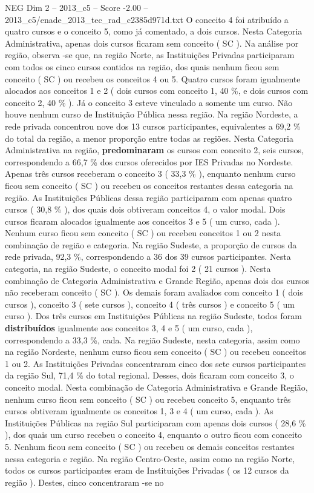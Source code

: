 \begin{textsample}{NEG Dim 2 – 2013\_c5 – Score -2.00 – 2013\_c5/enade\_2013\_tec\_rad\_c2385d971d.txt}
O conceito 4 foi atribuído a quatro cursos e o conceito 5, como já comentado, a dois cursos.
Nesta Categoria Administrativa, apenas dois cursos ficaram sem conceito ( SC ).
Na análise por região, observa -se que, na região Norte, as Instituições Privadas participaram com todos os cinco cursos contidos na região, dos quais nenhum ficou sem conceito ( SC ) ou recebeu os conceitos 4 ou 5.
Quatro cursos foram igualmente alocados aos conceitos 1 e 2 ( dois cursos com conceito 1, 40 \%, e dois cursos com conceito 2, 40 \% ).
Já o conceito 3 esteve vinculado a somente um curso.
Não houve nenhum curso de Instituição Pública nessa região.
Na região Nordeste, a rede privada concentrou nove dos 13 cursos participantes, equivalentes a 69,2 \% do total da região, a menor proporção entre todas as regiões.
Nesta Categoria Administrativa na região, \textbf{predominaram} os cursos com conceito 2, seis cursos, correspondendo a 66,7 \% dos cursos oferecidos por IES Privadas no Nordeste.
Apenas três cursos receberam o conceito 3 ( 33,3 \% ), enquanto nenhum curso ficou sem conceito ( SC ) ou recebeu os conceitos restantes dessa categoria na região.
As Instituições Públicas dessa região participaram com apenas quatro cursos ( 30,8 \% ), dos quais dois obtiveram conceitos 4, o valor modal.
Dois cursos ficaram alocados igualmente aos conceitos 3 e 5 ( um curso, cada ).
Nenhum curso ficou sem conceito ( SC ) ou recebeu conceitos 1 ou 2 nesta combinação de região e categoria.
Na região Sudeste, a proporção de cursos da rede privada, 92,3 \%, correspondendo a 36 dos 39 cursos participantes.
Nesta categoria, na região Sudeste, o conceito modal foi 2 ( 21 cursos ).
Nesta combinação de Categoria Administrativa e Grande Região, apenas dois dos cursos não receberam conceito ( SC ).
Os demais foram avaliados com conceito 1 ( dois cursos ), conceito 3 ( sete cursos ), conceito 4 ( três cursos ) e conceito 5 ( um curso ).
Dos três cursos em Instituições Públicas na região Sudeste, todos foram \textbf{distribuídos} igualmente aos conceitos 3, 4 e 5 ( um curso, cada ), correspondendo a 33,3 \%, cada.
Na região Sudeste, nesta categoria, assim como na região Nordeste, nenhum curso ficou sem conceito ( SC ) ou recebeu conceitos 1 ou 2.
As Instituições Privadas concentraram cinco dos sete cursos participantes da região Sul, 71,4 \% do total regional.
Desses, dois ficaram com conceito 3, o conceito modal.
Nesta combinação de Categoria Administrativa e Grande Região, nenhum curso ficou sem conceito ( SC ) ou recebeu conceito 5, enquanto três cursos obtiveram igualmente os conceitos 1, 3 e 4 ( um curso, cada ).
As Instituições Públicas na região Sul participaram com apenas dois cursos ( 28,6 \% ), dos quais um curso recebeu o conceito 4, enquanto o outro ficou com conceito 5.
Nenhum ficou sem conceito ( SC ) ou recebeu os demais conceitos restantes nessa categoria e região.
Na região Centro-Oeste, assim como na região Norte, todos os cursos participantes eram de Instituições Privadas ( os 12 cursos da região ).
Destes, cinco concentraram -se no

\end{textsample}

